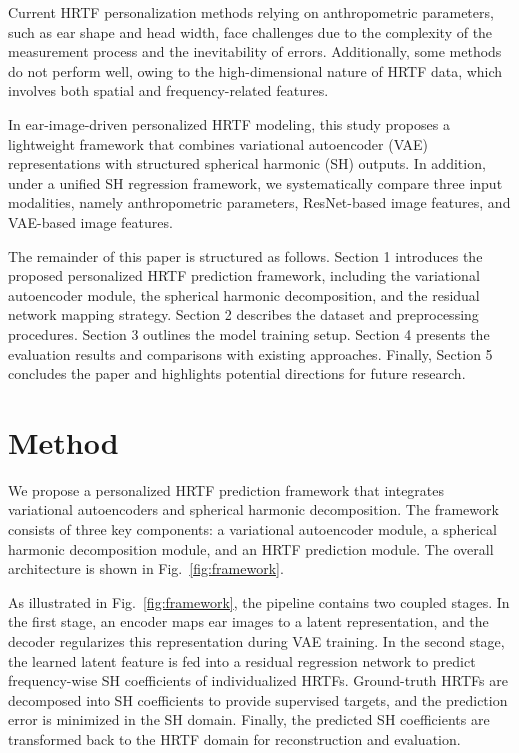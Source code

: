 \documentclass[a4paper,fleqn]{cas-dc}
\begin{document}
Current HRTF personalization methods relying on anthropometric parameters, such as ear shape and head width, face challenges due to the complexity of the measurement process and the inevitability of errors. Additionally, some methods do not perform well, owing to the high-dimensional nature of HRTF data, which involves both spatial and frequency-related features.

In ear-image-driven personalized HRTF modeling, this study proposes a lightweight framework that combines variational autoencoder (VAE) representations with structured spherical harmonic (SH) outputs. In addition, under a unified SH regression framework, we systematically compare three input modalities, namely anthropometric parameters, ResNet-based image features, and VAE-based image features.

The remainder of this paper is structured as follows. Section 1 introduces the proposed personalized HRTF prediction framework, including the variational autoencoder module, the spherical harmonic decomposition, and the residual network mapping strategy. Section 2 describes the dataset and preprocessing procedures. Section 3 outlines the model training setup. Section 4 presents the evaluation results and comparisons with existing approaches. Finally, Section 5 concludes the paper and highlights potential directions for future research.

\section{Method}

We propose a personalized HRTF prediction framework that integrates variational autoencoders and spherical harmonic decomposition. The framework consists of three key components: a variational autoencoder module, a spherical harmonic decomposition module, and an HRTF prediction module. The overall architecture is shown in Fig.~\ref{fig:framework}.

As illustrated in Fig.~\ref{fig:framework}, the pipeline contains two coupled stages. In the first stage, an encoder maps ear images to a latent representation, and the decoder regularizes this representation during VAE training. In the second stage, the learned latent feature is fed into a residual regression network to predict frequency-wise SH coefficients of individualized HRTFs. Ground-truth HRTFs are decomposed into SH coefficients to provide supervised targets, and the prediction error is minimized in the SH domain. Finally, the predicted SH coefficients are transformed back to the HRTF domain for reconstruction and evaluation.
\end{document}
